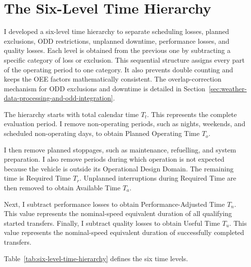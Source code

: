 \section{The Six-Level Time Hierarchy}
\label{sec:six-level-time-hierarchy}

I developed a six-level time hierarchy to separate scheduling losses, planned exclusions, ODD restrictions, unplanned downtime, performance losses, and quality losses. Each level is obtained from the previous one by subtracting a specific category of loss or exclusion. This sequential structure assigns every part of the operating period to one category. It also prevents double counting and keeps the OEE factors mathematically consistent. The overlap-correction mechanism for ODD exclusions and downtime is detailed in Section~\ref{sec:weather-data-processing-and-odd-integration}.

The hierarchy starts with total calendar time $T_t$. This represents the complete evaluation period. I remove non-operating periods, such as nights, weekends, and scheduled non-operating days, to obtain Planned Operating Time $T_o$.

I then remove planned stoppages, such as maintenance, refuelling, and system preparation. I also remove periods during which operation is not expected because the vehicle is outside its Operational Design Domain. The remaining time is Required Time $T_r$. Unplanned interruptions during Required Time are then removed to obtain Available Time $T_a$.

Next, I subtract performance losses to obtain Performance-Adjusted Time $T_n$. This value represents the nominal-speed equivalent duration of all qualifying started transfers. Finally, I subtract quality losses to obtain Useful Time $T_u$. This value represents the nominal-speed equivalent duration of successfully completed transfers.

Table~\ref{tab:six-level-time-hierarchy} defines the six time levels.

